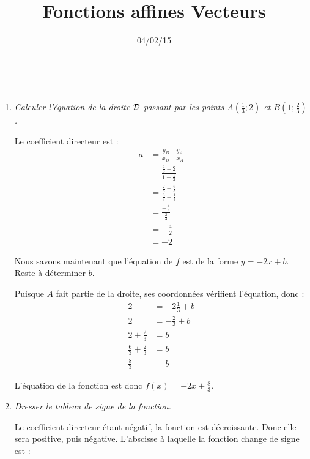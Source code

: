 \documentclass[12pt]{article}
\title{Fonctions affines Vecteurs}
\date{04/02/15}
\begin{document}
\maketitle

\begin{exercice}~
  \begin{enumerate}
    \item \emph{Calculer l'équation de la droite $\cal D$ passant par les points $A(\frac{1}{3}; 2)$ et $B(1; \frac{2}{3})$.}
      \begin{multicols}{2}
      Le coefficient directeur est :
      \begin{align*}
        a &= \frac{y_B-y_A}{x_B-x_A} \\
          &= \frac{\frac{2}{3}-2}{1-\frac{1}{3}} \\
          &= \frac{\frac{2}{3}-\frac{6}{3}}{\frac{3}{3}-\frac{1}{3}} \\
          &= \frac{-\frac{4}{3}}{\frac{2}{3}} \\
          &= -\frac{4}{2} \\
          &= -2
      \end{align*}

      Nous savons maintenant que l'équation de $f$ est de la forme $y=-2x+b$. Reste à déterminer $b$.

      \columnbreak

      Puisque $A$ fait partie de la droite, ses coordonnées vérifient l'équation, donc :
      \begin{align*}
        2 &= -2\frac{1}{3}+b \\
        2 &= -\frac{2}{3}+b \\
        2+\frac{2}{3} &= b \\
        \frac{6}{3}+\frac{2}{3} &= b \\
        \frac{8}{3} &= b
      \end{align*}
    \end{multicols}

      L'équation de la fonction est donc $f(x)=-2x+\frac{8}{3}$.

      \pagebreak

    \item \emph{Dresser le tableau de signe de la fonction.}
      \begin{multicols}{2}
      Le coefficient directeur étant négatif, la fonction est décroissante. Donc elle sera positive, puis négative. L'abscisse à laquelle la fonction change de signe est :


\end{multicols}
\end{enumerate}
\end{exercice}
\end{document}
